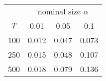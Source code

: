 % 
\begin{tabular}{cccc}
  \hline
  & \multicolumn{3}{c}{nominal size $\alpha$} \\
 $T$ & 0.01 & 0.05 & 0.1 \\
 \hline
100 & 0.012 & 0.047 & 0.073 \\ 
  250 & 0.015 & 0.048 & 0.107 \\ 
  500 & 0.018 & 0.079 & 0.136 \\ 
   \hline
\end{tabular}
